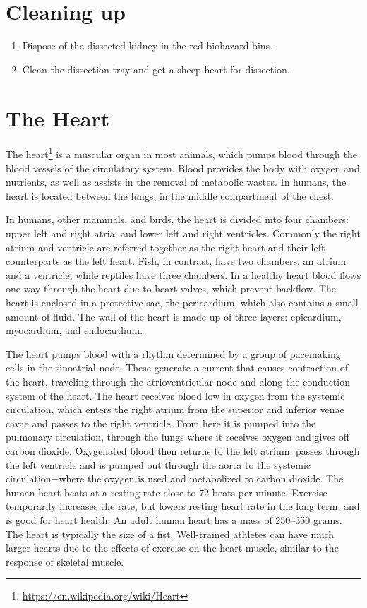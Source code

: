 \documentclass[]{book}
\providecommand{\tightlist}{%
  \setlength{\itemsep}{0pt}\setlength{\parskip}{0pt}}
\let\rmarkdownfootnote\footnote%
\def\footnote{\protect\rmarkdownfootnote}
\renewcommand{\href}[2]{#2\footnote{\url{#1}}}
\theoremstyle{definition}
\theoremstyle{definition}
\theoremstyle{definition}
\theoremstyle{remark}
\begin{document}
\section{Cleaning up}\label{cleaning-up-4}

\begin{enumerate}
\def\labelenumi{\arabic{enumi}.}
\tightlist
\item
  Dispose of the dissected kidney in the red biohazard bins.
\item
  Clean the dissection tray and get a sheep heart for dissection.
\end{enumerate}

\section{The Heart}\label{the-heart}

The \href{https://en.wikipedia.org/wiki/Heart}{heart} is a muscular
organ in most animals, which pumps blood through the blood vessels of
the circulatory system. Blood provides the body with oxygen and
nutrients, as well as assists in the removal of metabolic wastes. In
humans, the heart is located between the lungs, in the middle
compartment of the chest.

In humans, other mammals, and birds, the heart is divided into four
chambers: upper left and right atria; and lower left and right
ventricles. Commonly the right atrium and ventricle are referred
together as the right heart and their left counterparts as the left
heart. Fish, in contrast, have two chambers, an atrium and a ventricle,
while reptiles have three chambers. In a healthy heart blood flows one
way through the heart due to heart valves, which prevent backflow. The
heart is enclosed in a protective sac, the pericardium, which also
contains a small amount of fluid. The wall of the heart is made up of
three layers: epicardium, myocardium, and endocardium.

The heart pumps blood with a rhythm determined by a group of pacemaking
cells in the sinoatrial node. These generate a current that causes
contraction of the heart, traveling through the atrioventricular node
and along the conduction system of the heart. The heart receives blood
low in oxygen from the systemic circulation, which enters the right
atrium from the superior and inferior venae cavae and passes to the
right ventricle. From here it is pumped into the pulmonary circulation,
through the lungs where it receives oxygen and gives off carbon dioxide.
Oxygenated blood then returns to the left atrium, passes through the
left ventricle and is pumped out through the aorta to the systemic
circulation−where the oxygen is used and metabolized to carbon dioxide.
The human heart beats at a resting rate close to 72 beats per minute.
Exercise temporarily increases the rate, but lowers resting heart rate
in the long term, and is good for heart health. An adult human heart has
a mass of 250--350 grams. The heart is typically the size of a fist.
Well-trained athletes can have much larger hearts due to the effects of
exercise on the heart muscle, similar to the response of skeletal
muscle.
\end{document}

